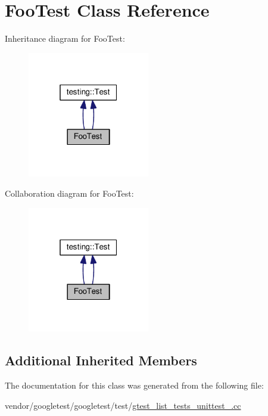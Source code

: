 \hypertarget{classFooTest}{}\section{Foo\+Test Class Reference}
\label{classFooTest}


Inheritance diagram for Foo\+Test\+:\nopagebreak
\begin{figure}[H]
\begin{center}
\leavevmode
\includegraphics[width=151pt]{classFooTest__inherit__graph}
\end{center}
\end{figure}


Collaboration diagram for Foo\+Test\+:\nopagebreak
\begin{figure}[H]
\begin{center}
\leavevmode
\includegraphics[width=151pt]{classFooTest__coll__graph}
\end{center}
\end{figure}
\subsection*{Additional Inherited Members}


The documentation for this class was generated from the following file\+:\begin{DoxyCompactItemize}
\item 
vendor/googletest/googletest/test/\hyperlink{gtest__list__tests__unittest___8cc}{gtest\+\_\+list\+\_\+tests\+\_\+unittest\+\_\+.\+cc}\end{DoxyCompactItemize}
